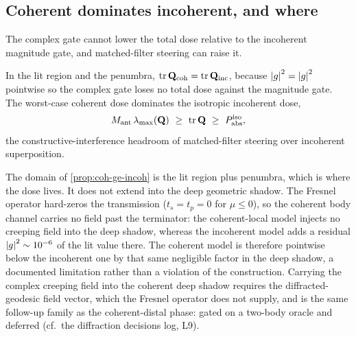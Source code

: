 \subsection{Coherent dominates incoherent, and where}

The complex gate cannot lower the total dose relative to the incoherent
magnitude gate, and matched-filter steering can raise it.

\begin{proposition}\label{prop:coh-ge-incoh}
In the lit region and the penumbra,
$\operatorname{tr}\mathbf{Q}_{\mathrm{coh}}=\operatorname{tr}\mathbf{Q}_{\mathrm{inc}}$,
because $\abs{g}^2=\abs{g}^2$ pointwise so the complex gate loses no
total dose against the magnitude gate. The worst-case coherent dose
dominates the isotropic incoherent dose,
\begin{equation}\label{eq:coh-ge-incoh}
  M_{\mathrm{ant}}\,\lambda_{\max}(\mathbf{Q})\ \ge\
  \operatorname{tr}\mathbf{Q}\ \ge\ P_{\mathrm{abs}}^{\mathrm{iso}},
\end{equation}
the constructive-interference headroom of matched-filter steering over
incoherent superposition.
\end{proposition}

The domain of \cref{prop:coh-ge-incoh} is the lit region plus penumbra,
which is where the dose lives. It does not extend into the deep
geometric shadow. The Fresnel operator hard-zeros the transmission
($t_s=t_p=0$ for $\mu\le 0$), so the coherent body channel carries no
field past the terminator: the coherent-local model injects no creeping
field into the deep shadow, whereas the incoherent model adds a residual
$\abs{g}^2\sim 10^{-6}$ of the lit value there. The coherent model is
therefore pointwise below the incoherent one by that same negligible
factor in the deep shadow, a documented limitation rather than a
violation of the construction. Carrying the complex creeping field into
the coherent deep shadow requires the diffracted-geodesic field vector,
which the Fresnel operator does not supply, and is the same follow-up
family as the coherent-distal phase: gated on a two-body oracle and
deferred (cf.\ the diffraction decisions log, L9).
